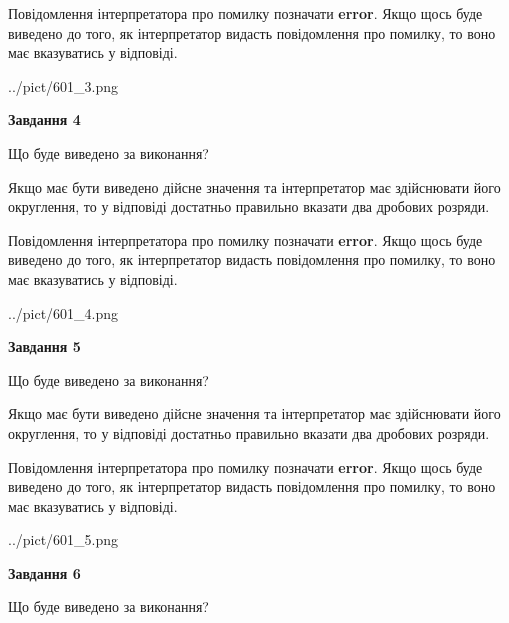 \documentclass[12pt, ukrainian]{article}
\begin{document}
{\begin {Large}
Повідомлення інтерпретатора про помилку позначати \textbf{error}.
Якщо щось буде виведено до того, як інтерпретатор видасть повідомлення про помилку, 
то воно має вказуватись у відповіді. \par

\begin{center}
	{../pict/601_3.png}
\end{center}
\newpage

{\begin {center}\textbf{Завдання 4}\end {center}}\par
Що буде виведено за виконання? \par

Якщо має бути виведено дійсне значення та інтерпретатор має здійснювати його округлення, 
то у відповіді достатньо правильно вказати два дробових розряди.

Повідомлення інтерпретатора про помилку позначати \textbf{error}.
Якщо щось буде виведено до того, як інтерпретатор видасть повідомлення про помилку, 
то воно має вказуватись у відповіді. \par

\begin{center}
	{../pict/601_4.png}
\end{center}
\newpage

{\begin {center}\textbf{Завдання 5}\end {center}}\par
Що буде виведено за виконання? \par

Якщо має бути виведено дійсне значення та інтерпретатор має здійснювати його округлення, 
то у відповіді достатньо правильно вказати два дробових розряди.

Повідомлення інтерпретатора про помилку позначати \textbf{error}.
Якщо щось буде виведено до того, як інтерпретатор видасть повідомлення про помилку, 
то воно має вказуватись у відповіді. \par

\begin{center}
	{../pict/601_5.png}
\end{center}
\newpage

{\begin {center}\textbf{Завдання 6}\end {center}}\par
Що буде виведено за виконання? \par


\end{Large}}
\end{document}
